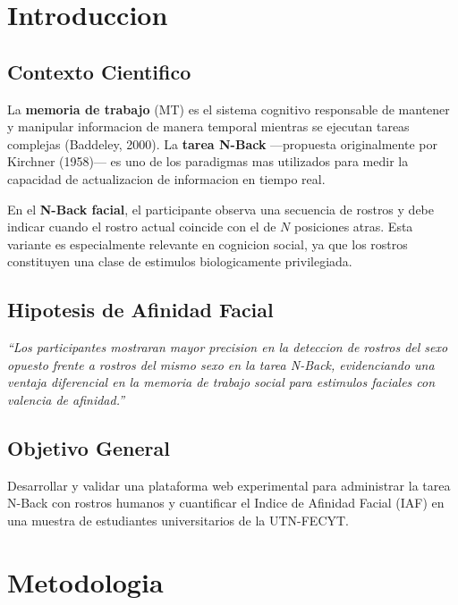 \documentclass[12pt,a4paper]{article}
\begin{document}
\section{Introduccion}

\subsection{Contexto Cientifico}

La \textbf{memoria de trabajo} (MT) es el sistema cognitivo responsable de mantener
y manipular informacion de manera temporal mientras se ejecutan tareas complejas
(Baddeley, 2000). La \textbf{tarea N-Back} ---propuesta originalmente por Kirchner
(1958)--- es uno de los paradigmas mas utilizados para medir la capacidad de
actualizacion de informacion en tiempo real.

En el \textbf{N-Back facial}, el participante observa una secuencia de rostros y debe
indicar cuando el rostro actual coincide con el de $N$ posiciones atras. Esta variante
es especialmente relevante en cognicion social, ya que los rostros constituyen una
clase de estimulos biologicamente privilegiada.

\subsection{Hipotesis de Afinidad Facial}

\begin{tcolorbox}[infobox, title={Hipotesis central}]
\textit{``Los participantes mostraran mayor precision en la deteccion de rostros del
sexo opuesto frente a rostros del mismo sexo en la tarea N-Back, evidenciando
una ventaja diferencial en la memoria de trabajo social para estimulos faciales
con valencia de afinidad.''}
\end{tcolorbox}

\subsection{Objetivo General}

Desarrollar y validar una plataforma web experimental para administrar la tarea
N-Back con rostros humanos y cuantificar el Indice de Afinidad Facial (IAF) en
una muestra de estudiantes universitarios de la UTN-FECYT.

\section{Metodologia}
\end{document}
